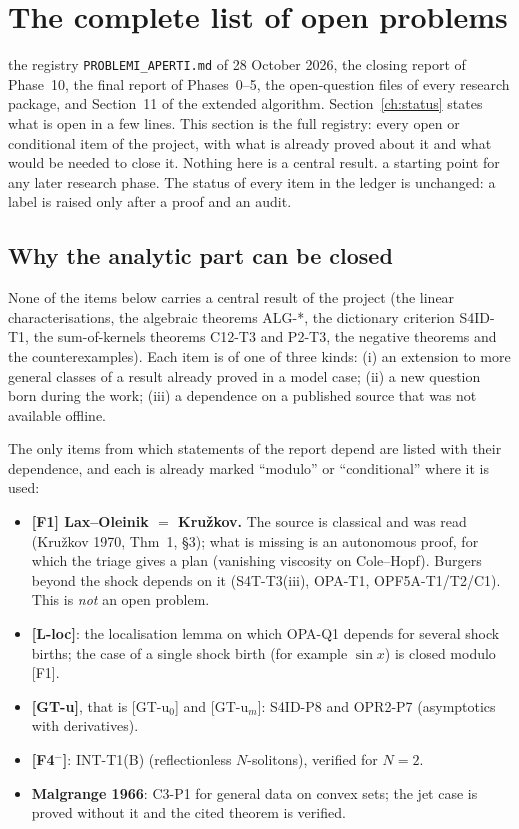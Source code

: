 \section{The complete list of open problems}\label{ch:openlist}
\sectionbrief
{the registry \texttt{PROBLEMI\_APERTI.md} of 28 October 2026, the closing report of Phase~10, the final report of Phases~0--5, the open-question files of every research package, and Section~11 of the extended algorithm.}
{Section~\ref{ch:status} states what is open in a few lines. This section is the full registry: every open or conditional item of the project, with what is already proved about it and what would be needed to close it. Nothing here is a central result.}
{a starting point for any later research phase. The status of every item in the ledger is unchanged: a label is raised only after a proof and an audit.}

\subsection{Why the analytic part can be closed}

None of the items below carries a central result of the project (the linear characterisations, the algebraic theorems ALG-*, the dictionary criterion S4ID-T1, the sum-of-kernels theorems C12-T3 and P2-T3, the negative theorems and the counterexamples). Each item is of one of three kinds: (i) an extension to more general classes of a result already proved in a model case; (ii) a new question born during the work; (iii) a dependence on a published source that was not available offline.

The only items from which statements of the report depend are listed with their dependence, and each is already marked ``modulo'' or ``conditional'' where it is used:
\begin{itemize}
\item \textbf{[F1] Lax--Oleinik $=$ Kru\v zkov.} The source is classical and was read (Kru\v zkov 1970, Thm~1, \S3); what is missing is an autonomous proof, for which the triage gives a plan (vanishing viscosity on Cole--Hopf). Burgers beyond the shock depends on it (S4T-T3(iii), OPA-T1, OPF5A-T1/T2/C1). This is \emph{not} an open problem.
\item \textbf{[L-loc]}: the localisation lemma on which OPA-Q1 depends for several shock births; the case of a single shock birth (for example $\sin x$) is closed modulo [F1].
\item \textbf{[GT-u]}, that is [GT-u$_0$] and [GT-u$_m$]: S4ID-P8 and OPR2-P7 (asymptotics with derivatives).
\item \textbf{[F4$^-$]}: INT-T1(B) (reflectionless $N$-solitons), verified for $N=2$.
\item \textbf{Malgrange 1966}: C3-P1 for general data on convex sets; the jet case is proved without it and the cited theorem is verified.
\end{itemize}

